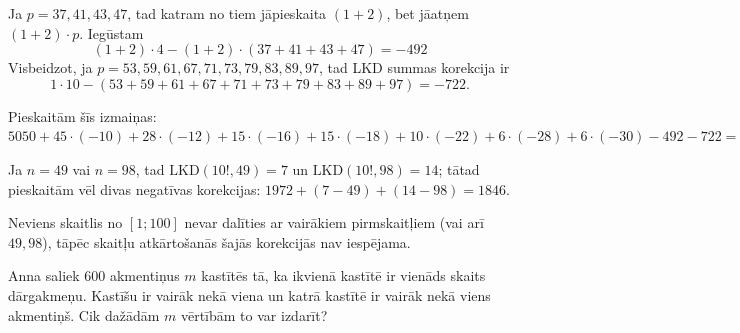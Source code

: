 \documentclass[a4paper,12pt]{article}
\newcommand\answer[1]{}
\begin{document}
\begin{problem}
{Ja $p=37, 41, 43, 47$, tad katram no tiem jāpieskaita $(1+2)$, bet jāatņem $(1+2)\cdot p$. Iegūstam
\[ (1 + 2) \cdot 4 - (1 + 2) \cdot (37 + 41 + 43 + 47) = -492 \]
Visbeidzot, ja $p = 53,59,61,67,71,73,79,83,89,97$, tad LKD summas korekcija ir 
\[ 1 \cdot 10 - (53 + 59 + 61 + 67 + 71 + 73 + 79 + 83 + 89 + 97) = -722. \]

Pieskaitām šīs izmaiņas:\\
{\small
$5050 + 45 \cdot (-10) + 28 \cdot (-12) + 15 \cdot (-16) + 15 \cdot (-18) + 10 \cdot (-22) + 6 \cdot (-28) + 6 \cdot (-30) - 492 - 722 = 1972.$
}

Ja $n=49$ vai $n=98$, tad $\text{LKD}(10!,49) = 7$ un $\text{LKD}(10!,98) = 14$; tātad pieskaitām vēl divas negatīvas korekcijas: 
$1972 + (7-49) + (14 - 98) = 1846$.

Neviens skaitlis no $[1;100]$ nevar dalīties ar vairākiem pirmskaitļiem (vai arī $49,98$), 
tāpēc skaitļu atkārtošanās šajās korekcijās nav iespējama.
}
\end{problem}
%


\vspace{10pt}
\begin{problem}
Anna saliek $600$ akmentiņus $m$ kastītēs tā, ka ikvienā kastītē ir vienāds skaits dārgakmeņu. 
Kastīšu ir vairāk nekā viena un katrā kastītē ir vairāk nekā viens akmentiņš. 
Cik dažādām $m$ vērtībām to var izdarīt?
\answer{

{\bf Atbilde:} $\mathtt{22}$\\
Skaitļa $600$ sadalījums pirmreizinātājos ir $600 = 2^3 \cdot 3^1 \cdot 5^2$.
(Citiem vārdiem, $600  = p_1^{a_1} \cdot p_2^{a_2} \cdot p_3^{a_3}$, kur $p_1 = 2$, $p_2 = 3$, $p_3 = 5$, bet 
$a_1 = 3$, $a_2 = 1$, $a_3 = 2$.)

Tādēļ pozitīvo dalītāju skaits skaitlim $600$ ir (izmantojam formulu no \cite{Raji2020}):
\[ \sigma_0(600) = \sum\limits_{d \mid 600} 1 = \prod\limits_{i=1}^{3} (a_i+1) = (3 + 1)(1+1)(2+1) = 4 \cdot 2 \cdot 3 = 24. \]
Neder tie gadījumi, kad kastīšu skaits $m=1$ vai $m=600$. Atliek $24 - 2 = 22$ iespējas skaitļa $m$ vērtībai.


}
\end{problem}
\end{document}
